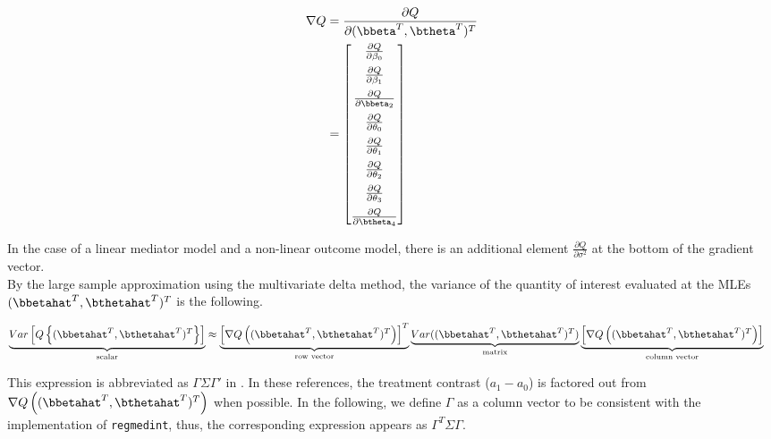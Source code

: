 \documentclass[dvipdfmx,10pt]{article}
\begin{document}
\begin{align*}
\nabla Q &= \frac{\partial Q}{\partial (\bbeta^{T},\btheta^{T})^{T}}\\
         &= \begin{bmatrix}
           \frac{\partial Q}{\partial \beta_{0}}\\[6pt]
           \frac{\partial Q}{\partial \beta_{1}}\\[6pt]
           \frac{\partial Q}{\partial \bbeta_{2}}\\[6pt]
           \frac{\partial Q}{\partial \theta_{0}}\\[6pt]
           \frac{\partial Q}{\partial \theta_{1}}\\[6pt]
           \frac{\partial Q}{\partial \theta_{2}}\\[6pt]
           \frac{\partial Q}{\partial \theta_{3}}\\[6pt]
           \frac{\partial Q}{\partial \btheta_{4}}\\
         \end{bmatrix}\\
\end{align*}

In the case of a linear mediator model and a non-linear outcome model, there is an additional element \(\frac{\partial Q}{\partial \sigma^{2}}\) at the bottom of the gradient vector.\\

By the large sample approximation using the multivariate delta method, the variance of the quantity of interest evaluated at the MLEs \((\bbetahat^{T},\bthetahat^{T})^{T}\) is the following.

\begin{align*}
  \underbrace{Var \left[ Q\left\{ (\bbetahat^{T},\bthetahat^{T})^{T} \right\} \right]}_{\text{scalar}}
  &\approx
  \underbrace{\left[ \nabla Q \left( (\bbetahat^{T},\bthetahat^{T})^{T} \right) \right]^{T}}_{\text{row vector}}
  \underbrace{Var((\bbetahat^{T},\bthetahat^{T})^{T})}_{\text{matrix}}
  \underbrace{\left[ \nabla Q \left( (\bbetahat^{T},\bthetahat^{T})^{T} \right) \right]}_{\text{column vector}}
\end{align*}

This expression is abbreviated as \(\Gamma\Sigma\Gamma'\) in \cite{vanderweeleExplanationCausalInference2015,valeriMediationAnalysisAllowing2013,valeriSASMacroCausal2015}. In these references, the treatment contrast (\(a_{1}-a_{0}\)) is factored out from \(\nabla Q \left( (\bbetahat^{T},\bthetahat^{T})^{T} \right)\) when possible. In the following, we define \(\Gamma\) as a column vector to be consistent with the implementation of \texttt{regmedint}, thus, the corresponding expression appears as \(\Gamma^{T}\Sigma\Gamma\).
\end{document}
